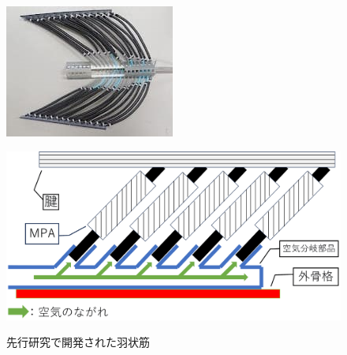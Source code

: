 \begin{figure}[htbp]
  \begin{minipage}{0.49\hsize}
    \centering  
    \includegraphics[scale=0.9]{image/syuseki_1.JPG}
    \label{fig:ujyoukin_real_kako}
  \end{minipage}
  \begin{minipage}{0.49\hsize}
    \centering
    \includegraphics[scale=0.04]{image/air_moshiki.png}
    \label{fig:ujyoukin_moshiki_kako}
  \end{minipage}
  \caption{先行研究で開発された羽状筋}
  \label{fig:ujyoukin_kako}
\end{figure}
%
